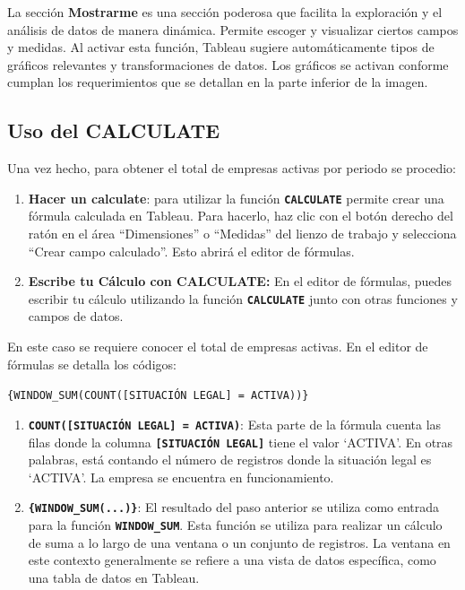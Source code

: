 \documentclass[
]{article}
\providecommand{\tightlist}{%
  \setlength{\itemsep}{0pt}\setlength{\parskip}{0pt}}
\begin{document}
La sección \textbf{Mostrarme} es una sección poderosa que facilita la
exploración y el análisis de datos de manera dinámica. Permite escoger y
visualizar ciertos campos y medidas. Al activar esta función, Tableau
sugiere automáticamente tipos de gráficos relevantes y transformaciones
de datos. Los gráficos se activan conforme cumplan los requerimientos
que se detallan en la parte inferior de la imagen.

\hypertarget{uso-del-calculate}{%
\subsection{Uso del CALCULATE}\label{uso-del-calculate}}

Una vez hecho, para obtener el total de empresas activas por periodo se
procedio:

\begin{enumerate}
\def\labelenumi{\arabic{enumi}.}
\tightlist
\item
  \textbf{Hacer un calculate}: para utilizar la función
  \textbf{\texttt{CALCULATE}} permite crear una fórmula calculada en
  Tableau. Para hacerlo, haz clic con el botón derecho del ratón en el
  área ``Dimensiones'' o ``Medidas'' del lienzo de trabajo y selecciona
  ``Crear campo calculado''. Esto abrirá el editor de fórmulas.
\item
  \textbf{Escribe tu Cálculo con CALCULATE:} En el editor de fórmulas,
  puedes escribir tu cálculo utilizando la función
  \textbf{\texttt{CALCULATE}} junto con otras funciones y campos de
  datos.
\end{enumerate}

En este caso se requiere conocer el total de empresas activas. En el
editor de fórmulas se detalla los códigos:

\texttt{\{WINDOW\_SUM(COUNT({[}SITUACIÓN\ LEGAL{]}\ =\ \textquotesingle{}ACTIVA\textquotesingle{}))\}}

\begin{enumerate}
\def\labelenumi{\arabic{enumi}.}
\item
  \textbf{\texttt{COUNT({[}SITUACIÓN\ LEGAL{]}\ =\ \textquotesingle{}ACTIVA\textquotesingle{})}}:
  Esta parte de la fórmula cuenta las filas donde la columna
  \textbf{\texttt{{[}SITUACIÓN\ LEGAL{]}}} tiene el valor `ACTIVA'. En
  otras palabras, está contando el número de registros donde la
  situación legal es `ACTIVA'. La empresa se encuentra en
  funcionamiento.
\item
  \textbf{\texttt{\{WINDOW\_SUM(...)\}}}: El resultado del paso anterior
  se utiliza como entrada para la función \textbf{\texttt{WINDOW\_SUM}}.
  Esta función se utiliza para realizar un cálculo de suma a lo largo de
  una ventana o un conjunto de registros. La ventana en este contexto
  generalmente se refiere a una vista de datos específica, como una
  tabla de datos en Tableau.
\end{enumerate}
\end{document}
